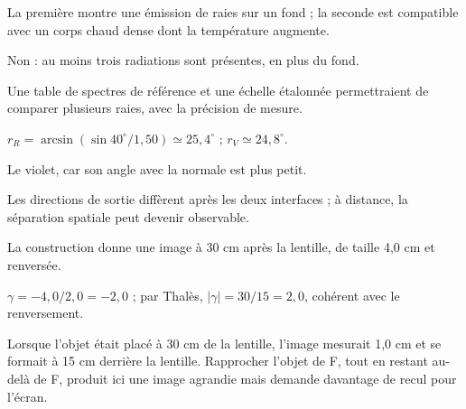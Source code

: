 \begin{questions}
\item La première montre une émission de raies sur un fond ; la seconde est compatible avec un corps chaud dense dont la température augmente.
\item Non : au moins trois radiations sont présentes, en plus du fond.
\item Une table de spectres de référence et une échelle étalonnée permettraient de comparer plusieurs raies, avec la précision de mesure.
\end{questions}

\begin{questions}
\item $r_R=\arcsin(\sin40^\circ/1,50)\simeq25,4^\circ$ ; $r_V\simeq24,8^\circ$.
\item Le violet, car son angle avec la normale est plus petit.
\item Les directions de sortie diffèrent après les deux interfaces ; à distance, la séparation spatiale peut devenir observable.
\end{questions}

\begin{questions}
\item La construction donne une image à 30 cm après la lentille, de taille 4,0 cm et renversée.
\item $\gamma=-4,0/2,0=-2,0$ ; par Thalès, $|\gamma|=30/15=2,0$, cohérent avec le renversement.
\item Lorsque l’objet était placé à 30 cm de la lentille, l’image mesurait 1,0 cm et se formait à 15 cm derrière la lentille. Rapprocher l’objet de F, tout en restant au-delà de F, produit ici une image agrandie mais demande davantage de recul pour l’écran.
\end{questions}

